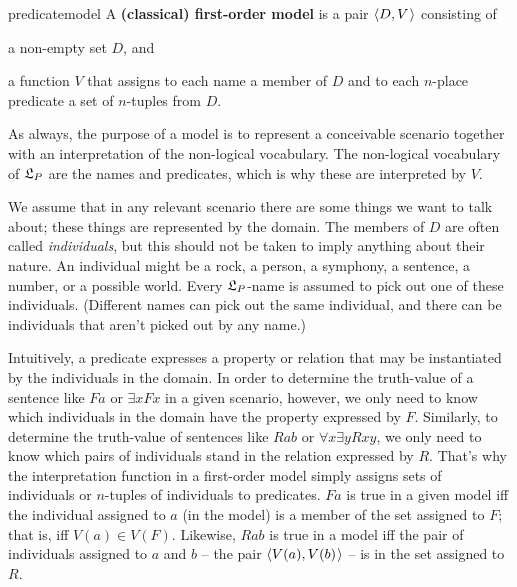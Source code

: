
\begin{definition}{}{predicatemodel}
  A \textbf{(classical) first-order model} is a pair $\t{D,V}$ consisting of
  \vspace{-3mm}
  \begin{itemize*}
    \item a non-empty set $D$, and
    \item a function $V$ that assigns to each name a member of $D$ and to each
    $n$-place predicate a set of $n$-tuples from $D$.
  \end{itemize*}
\end{definition}

As always, the purpose of a model is to represent a conceivable scenario together
with an interpretation of the non-logical vocabulary. The non-logical vocabulary
of $\mathfrak{L}_P$ are the names and predicates, which is why these are interpreted by
$V$. 

We assume that in any relevant scenario there are some things we want to talk
about; these things are represented by the domain. The members of $D$ are often
called \emph{individuals}, but this should not be taken to imply anything about
their nature. An individual might be a rock, a person, a symphony, a sentence, a
number, or a possible world. Every $\mathfrak{L}_P$-name is assumed to pick out one of
these individuals. (Different names can pick out the same individual, and there
can be individuals that aren't picked out by any name.)

Intuitively, a predicate expresses a property or relation that may be
instantiated by the individuals in the domain. In order to determine the
truth-value of a sentence like $Fa$ or $\exists x Fx$ in a given scenario,
however, we only need to know which individuals in the domain have the property
expressed by $F$. Similarly, to determine the truth-value of sentences like
$Rab$ or $\forall x \exists y Rxy$, we only need to know which pairs of
individuals stand in the relation expressed by $R$. That's why the
interpretation function in a first-order model simply assigns sets of
individuals or $n$-tuples of individuals to predicates. $Fa$ is true in a given
model iff the individual assigned to $a$ (in the model) is a member of the set
assigned to $F$; that is, iff $V(a) \in V(F)$. Likewise, $Rab$ is true in a
model iff the pair of individuals assigned to $a$ and $b$ -- the pair
$\t{V(a),V(b)}$ -- is in the set assigned to $R$.

